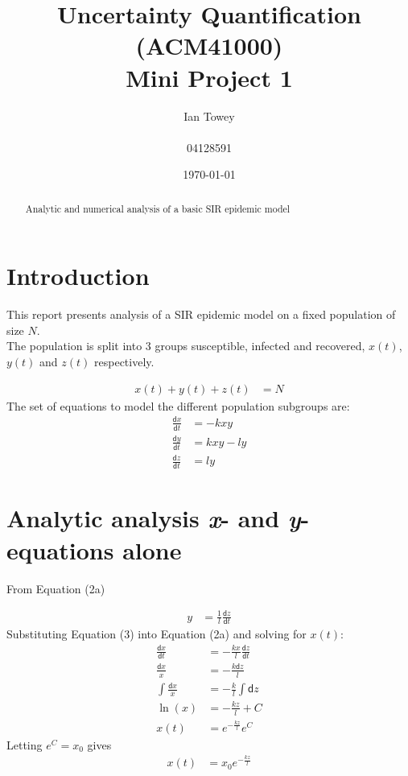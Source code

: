 \documentclass[a4paper]{article}
\title{Uncertainty Quantification (ACM41000) \\ Mini Project 1}
\author{Ian Towey \\ \\ 04128591}
\date{\today}
\begin{document}
  \maketitle

  \begin{abstract}
    Analytic and numerical analysis of a basic SIR epidemic model
  \end{abstract}

\tableofcontents
\newpage

\section{Introduction}
\label{sec:introduction}
This report presents analysis of a SIR epidemic model on a fixed population of size $N$. \\

The population is split into 3 groups susceptible, infected and recovered, $x(t)$, $y(t)$ and $z(t)$ 
respectively.

\begin{align}
 x(t) + y(t) + z(t) &= N
\end{align}
The set of equations to model the different population subgroups are:
\begin{subequations}
\begin{align}
  \frac{\mathsf{d}x}{\mathsf{d}t} &= -kxy			\\
  \frac{\mathsf{d}y}{\mathsf{d}t} &= kxy - ly		\\
  \frac{\mathsf{d}z}{\mathsf{d}t} &= ly			
\end{align}
\end{subequations}

\section{Analytic analysis \textit{x}- and \textit{y}- equations alone}
\label{sec:theory}
From Equation (2a)

\begin{align}
   y &= \frac{1}{l}\frac{\mathsf{d}z}{\mathsf{d}t}		
\end{align}
Substituting Equation (3) into Equation (2a) and solving for $x(t)$:
\begin{align*}
  \frac{\mathsf{d}x}{\mathsf{d}t} &= -\frac{kx}{l}\frac{\mathsf{d}z}{\mathsf{d}t}	\\		
  \frac{\mathsf{d}x}{x} &= -\frac{k\mathsf{d}z}{l}		\\
  \int{\frac{\mathsf{d}x}{x}} &= -\frac{k}{l}\int{\mathsf{d}z}	\\
  \ln(x) &= -\frac{kz}{l} + C			\\
  x(t) &= e^{-\frac{kz}{l}}e^{C}
\end{align*}
Letting $e^{C} = x_{0}$ gives
\begin{align}
  x(t) &= x_{0}e^{-\frac{kz}{l}}
\end{align}
\end{document}
